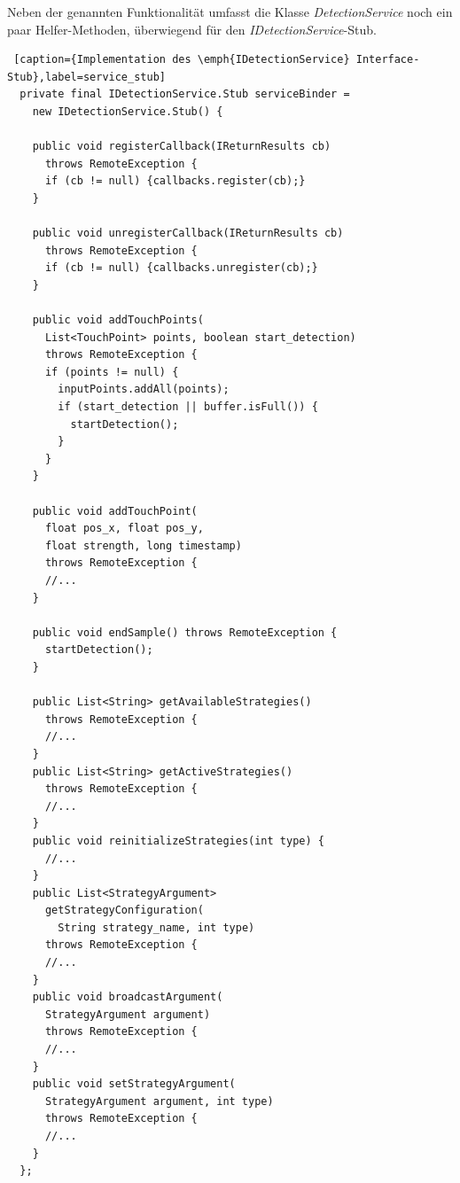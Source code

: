 Neben der genannten Funktionalität umfasst die Klasse \emph{DetectionService} noch ein paar Helfer-Methoden, überwiegend für den \emph{IDetectionService}-Stub.

\begin{lstlisting} [caption={Implementation des \emph{IDetectionService} Interface-Stub},label=service_stub]
  private final IDetectionService.Stub serviceBinder = 
    new IDetectionService.Stub() {

    public void registerCallback(IReturnResults cb) 
      throws RemoteException {
      if (cb != null) {callbacks.register(cb);}
    }

    public void unregisterCallback(IReturnResults cb) 
      throws RemoteException {
      if (cb != null) {callbacks.unregister(cb);}
    }

    public void addTouchPoints(
      List<TouchPoint> points, boolean start_detection) 
      throws RemoteException {
      if (points != null) {
        inputPoints.addAll(points);
        if (start_detection || buffer.isFull()) {
          startDetection();
        }
      }
    }

    public void addTouchPoint(
      float pos_x, float pos_y, 
      float strength, long timestamp) 
      throws RemoteException {
      //...
    }

    public void endSample() throws RemoteException {
      startDetection();
    }

    public List<String> getAvailableStrategies() 
      throws RemoteException {
      //...
    }
    public List<String> getActiveStrategies() 
      throws RemoteException {
      //...
    }
    public void reinitializeStrategies(int type) {
      //...
    }
    public List<StrategyArgument> 
      getStrategyConfiguration(
        String strategy_name, int type) 
      throws RemoteException {
      //...
    }
    public void broadcastArgument(
      StrategyArgument argument) 
      throws RemoteException {
      //...
    }
    public void setStrategyArgument(
      StrategyArgument argument, int type) 
      throws RemoteException {
      //...
    }
  };
\end{lstlisting}

